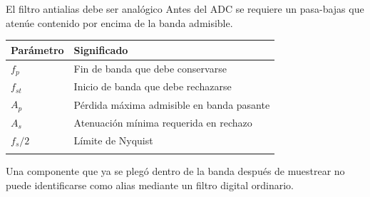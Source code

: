 \documentclass[
  ignorenonframetext,
  aspectratio=169,
  spanish,
  professionalfonts]{beamer}
\newcounter{none} %
\begin{document}
\begin{frame}{El filtro antialias debe ser analógico}
\protect{}\label{el-filtro-antialias-debe-ser-analuxf3gico}
Antes del ADC se requiere un pasa-bajas que atenúe contenido por encima
de la banda admisible.

{\def\LTcaptype{none} %
\begin{longtable}[]{@{}ll@{}}
\toprule\noalign{}
Parámetro & Significado \\
\midrule\noalign{}
\endhead
\(f_p\) & Fin de banda que debe conservarse \\
\(f_{st}\) & Inicio de banda que debe rechazarse \\
\(A_p\) & Pérdida máxima admisible en banda pasante \\
\(A_s\) & Atenuación mínima requerida en rechazo \\
\(f_s/2\) & Límite de Nyquist \\
\bottomrule\noalign{}
\end{longtable}
}

\begin{tcolorbox}[enhanced jigsaw, arc=.35mm, bottomrule=.15mm, bottomtitle=1mm, breakable, colback=white, colbacktitle=quarto-callout-important-color!10!white, colframe=quarto-callout-important-color-frame, coltitle=black, left=2mm, leftrule=.75mm, opacityback=0, opacitybacktitle=0.6, rightrule=.15mm, title={Orden causal de las operaciones}, titlerule=0mm, toprule=.15mm, toptitle=1mm]

Una componente que ya se plegó dentro de la banda después de muestrear
no puede identificarse como alias mediante un filtro digital ordinario.

\end{tcolorbox}
\end{frame}
\end{document}
